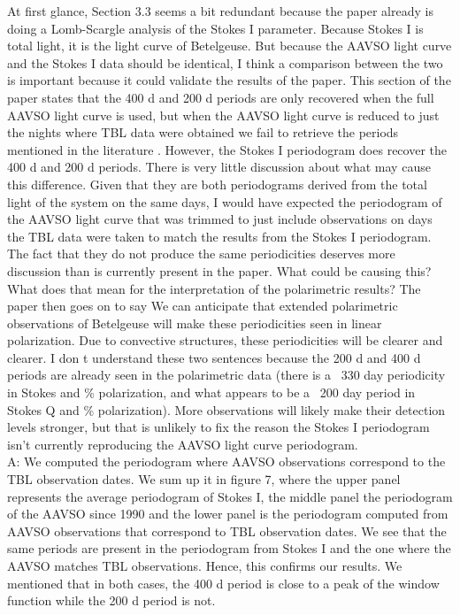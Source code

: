 \documentclass{article}
\begin{document}
At first glance, Section 3.3 seems a bit redundant because the paper already is doing a
Lomb-Scargle analysis of the Stokes I parameter. Because Stokes I is total light, it is the light
curve of Betelgeuse. But because the AAVSO light curve and the Stokes I data should be
identical, I think a comparison between the two is important because it could validate the results
of the paper. This section of the paper states that the 400 d and 200 d periods are only
recovered when the full AAVSO light curve is used, but when the AAVSO light curve is reduced
to just the nights where TBL data were obtained we fail to retrieve the periods mentioned in the
literature . However, the Stokes I periodogram does recover the 400 d and 200 d periods. There
is very little discussion about what may cause this difference. Given that they are both
periodograms derived from the total light of the system on the same days, I would have
expected the periodogram of the AAVSO light curve that was trimmed to just include
observations on days the TBL data were taken to match the results from the Stokes I
periodogram. The fact that they do not produce the same periodicities deserves more
discussion than is currently present in the paper. What could be causing this? What does that
mean for the interpretation of the polarimetric results? The paper then goes on to say We can
anticipate that extended polarimetric observations of Betelgeuse will make these periodicities
seen in linear polarization. Due to convective structures, these periodicities will be clearer and
clearer. I don t understand these two sentences because the 200 d and 400 d periods are
already seen in the polarimetric data (there is a ~330 day periodicity in Stokes and
\% polarization, and what appears to be a ~200 day period in Stokes Q and \% polarization). More
observations will likely make their detection levels stronger, but that is unlikely to fix the reason
the Stokes I periodogram isn’t currently reproducing the AAVSO light curve periodogram.\\

A: We computed the periodogram where AAVSO observations correspond to the TBL observation dates. We sum up it in figure 7, where the upper panel represents the average periodogram of Stokes I, the middle panel the periodogram of the AAVSO since 1990 and the lower panel is the periodogram computed from AAVSO observations that correspond to TBL observation dates. We see that the same periods are present in the periodogram from Stokes I and the one where the AAVSO matches TBL observations. Hence, this confirms our results. We mentioned that in both cases, the 400 d period is close to a peak of the window function while the 200 d period is not. \\
\end{document}
